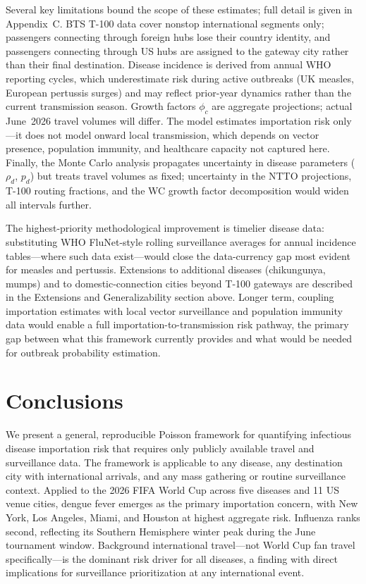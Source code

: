 \documentclass[12pt]{article}
\begin{document}
Several key limitations bound the scope of these estimates; full detail is given in Appendix~C. BTS T-100 data cover nonstop international segments only; passengers connecting through foreign hubs lose their country identity, and passengers connecting through US hubs are assigned to the gateway city rather than their final destination. Disease incidence is derived from annual WHO reporting cycles, which underestimate risk during active outbreaks (UK measles, European pertussis surges) and may reflect prior-year dynamics rather than the current transmission season. Growth factors $\phi_c$ are aggregate projections; actual June~2026 travel volumes will differ. The model estimates importation risk only---it does not model onward local transmission, which depends on vector presence, population immunity, and healthcare capacity not captured here. Finally, the Monte Carlo analysis propagates uncertainty in disease parameters ($\rho_d$, $p_d$) but treats travel volumes as fixed; uncertainty in the NTTO projections, T-100 routing fractions, and the WC growth factor decomposition would widen all intervals further.

The highest-priority methodological improvement is timelier disease data: substituting WHO FluNet-style rolling surveillance averages for annual incidence tables---where such data exist---would close the data-currency gap most evident for measles and pertussis. Extensions to additional diseases (chikungunya, mumps) and to domestic-connection cities beyond T-100 gateways are described in the Extensions and Generalizability section above. Longer term, coupling importation estimates with local vector surveillance and population immunity data would enable a full importation-to-transmission risk pathway, the primary gap between what this framework currently provides and what would be needed for outbreak probability estimation.

\section*{Conclusions}

We present a general, reproducible Poisson framework for quantifying
infectious disease importation risk that requires only publicly
available travel and surveillance data. The framework is applicable
to any disease, any destination city with international arrivals,
and any mass gathering or routine surveillance context. Applied to
the 2026 FIFA World Cup across five diseases and 11 US venue cities,
dengue fever emerges as the primary importation concern, with New
York, Los Angeles, Miami, and Houston at highest aggregate risk.
Influenza ranks second, reflecting its Southern Hemisphere winter
peak during the June tournament window. Background international
travel---not World Cup fan travel specifically---is the dominant
risk driver for all diseases, a finding with direct implications for
surveillance prioritization at any international event.
\end{document}
